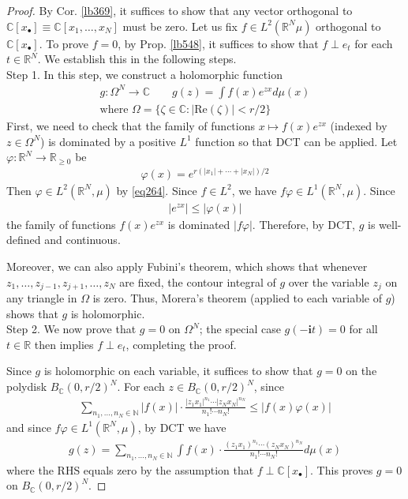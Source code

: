 \documentclass[12pt,b5paper,notitlepage]{article}
\theoremstyle{definition}
\theoremstyle{plain}
\newcommand{\im}{\mathbf{i}}
\newcommand{\blt}{\bullet}
\newcommand{\Cbb}{\mathbb C}
\newcommand{\Nbb}{\mathbb N}
\newcommand{\Rbb}{\mathbb R}
\newcommand{\Real}{\mathrm{Re}}
\numberwithin{equation}{section}
\begin{document}
\begin{proof}
By Cor. \ref{lb369}, it suffices to show that any vector orthogonal to $\Cbb[x_\blt]\equiv\Cbb[x_1,\dots,x_N]$ must be zero. Let us fix $f\in L^2(\Rbb^N\mu)$ orthogonal to $\Cbb[x_\blt]$. To prove $f=0$, by Prop. \ref{lb548}, it suffices to show that $f\perp e_t$ for each $t\in\Rbb^N$. We establish this in the following steps.\\[-1ex]


Step 1. In this step, we construct a holomorphic function
\begin{gather*}
g:\Omega^N\rightarrow\Cbb\qquad g(z)=\int f(x)e^{zx}d\mu(x)\\
\text{where }\Omega=\{\zeta\in\Cbb:|\Real(\zeta)|<r/2\}
\end{gather*}
First, we need to check that the family of functions $x\mapsto f(x)e^{zx}$ (indexed by $z\in\Omega^N$) is dominated by a positive $L^1$ function so that DCT can be applied. Let $\varphi:\Rbb^N\rightarrow\Rbb_{\geq0}$ be
\begin{align*}
\varphi(x)=e^{r(|x_1|+\cdots+|x_N|)/2}
\end{align*}
Then $\varphi\in L^2(\Rbb^N,\mu)$ by \eqref{eq264}. Since $f\in L^2$, we have $f\varphi\in L^1(\Rbb^N,\mu)$. Since
\begin{align*}
|e^{zx}|\leq |\varphi(x)|
\end{align*}
the family of functions $f(x)e^{zx}$ is dominated $|f\varphi|$. Therefore, by DCT, $g$ is well-defined and continuous.

Moreover, we can also apply Fubini's theorem, which shows that whenever $z_1,\dots,z_{j-1},z_{j+1},\dots,z_N$ are fixed, the contour integral of $g$ over the variable $z_j$ on any triangle in $\Omega$ is zero. Thus, Morera's theorem (applied to each variable of $g$) shows that $g$ is holomorphic.\\[-1ex]



Step 2. We now prove that $g=0$ on $\Omega^N$; the special case $g(-\im t)=0$ for all $t\in\Rbb$ then implies $f\perp e_t$, completing the proof.

Since $g$ is holomorphic on each variable, it suffices to show that $g=0$ on the polydisk $B_\Cbb(0,r/2)^N$. For each $z\in B_\Cbb(0,r/2)^N$, since
\begin{align*}
\sum_{n_1,\dots,n_N\in\Nbb}|f(x)|\cdot\frac{|z_1x_1|^{n_1}\cdots|z_Nx_N|^{n_N}}{n_1!\cdots n_N!}\leq |f(x)\varphi(x)|
\end{align*}
and since $f\varphi\in L^1(\Rbb^N,\mu)$, by DCT we have
\begin{align*}
g(z)=\sum_{n_1,\dots,n_N\in\Nbb}\int f(x)\cdot\frac{(z_1x_1)^{n_1}\cdots(z_Nx_N)^{n_N}}{n_1!\cdots n_N!}d\mu(x)
\end{align*}
where the RHS equals zero by the assumption that $f\perp\Cbb[x_\blt]$. This proves $g=0$ on $B_\Cbb(0,r/2)^N$.
\end{proof}
\end{document}
